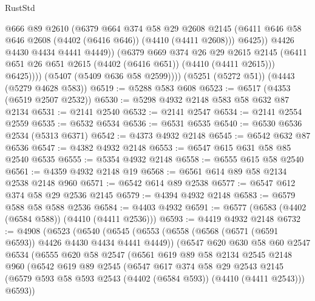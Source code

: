 \begin{lexlean}{RustStd}
\begin{coremodule}
                    @666
                    @89
                    @2610
                    (@6379
                      @664
                      @374
                      @58
                      @29
                      @2608
                      @2145
                      (@6411 @646 @58 @646 @2608 (@4402 (@6416 @646)) (@4410 (@4411 @2608)))
                      @6425))
                  @4426
                  @4430
                  @4434
                  @4441
                  @4449))
              (@6379
                @669
                @374
                @26
                @29
                @2615
                @2145
                (@6411 @651 @26 @651 @2615 (@4402 (@6416 @651)) (@4410 (@4411 @2615)))
                @6425))))
        (@5407 (@5409 @636 @58 @2599))))
    (@5251 (@5272 @51))
    (@4443 (@5279 @4628 @583))
@6519 := @5288 @583 @608
@6523 := @6517 (@4353 (@6519 @2507 @2532))
@6530 := @5298 @4932 @2148 @583 @58 @632 @87 @2134
@6531 := @2141 @2540
@6532 := @2141 @2547
@6534 := @2141 @2554 @2559
@6535 := @6532 @6534
@6536 := @6531 @6535
@6540 := @6530 @6536 @2534 (@5313 @6371)
@6542 := @4373 @4932 @2148
@6545 := @6542 @632 @87 @6536
@6547 := @4382 @4932 @2148
@6553 := @6547 @615 @631 @58 @85 @2540 @6535
@6555 := @5354 @4932 @2148
@6558 := @6555 @615 @58 @2540
@6561 := @4359 @4932 @2148 @19
@6568 := @6561 @614 @89 @58 @2134 @2538 @2148 @960
@6571 := @6542 @614 @89 @2538
@6577 := @6547 @612 @374 @58 @29 @2536 @2145
@6579 := @4394 @4932 @2148
@6583 := @6579 @588 @58 @588 @2536
@6584 := @4403 @4932
@6591 := @6577 (@6583 (@4402 (@6584 @588)) (@4410 (@4411 @2536)))
@6593 := @4419 @4932 @2148
@6732 := @4908
    (@6523
      (@6540
        (@6545
          (@6553
            (@6558 (@6568 (@6571 (@6591 @6593)) @4426 @4430 @4434 @4441 @4449))
            (@6547
              @620
              @630
              @58
              @60
              @2547
              @6534
              (@6555
                @620
                @58
                @2547
                (@6561
                  @619
                  @89
                  @58
                  @2134
                  @2545
                  @2148
                  @960
                  (@6542
                    @619
                    @89
                    @2545
                    (@6547
                      @617
                      @374
                      @58
                      @29
                      @2543
                      @2145
                      (@6579 @593 @58 @593 @2543 (@4402 (@6584 @593)) (@4410 (@4411 @2543)))
                      @6593))

\end{coremodule}
\end{lexlean}
